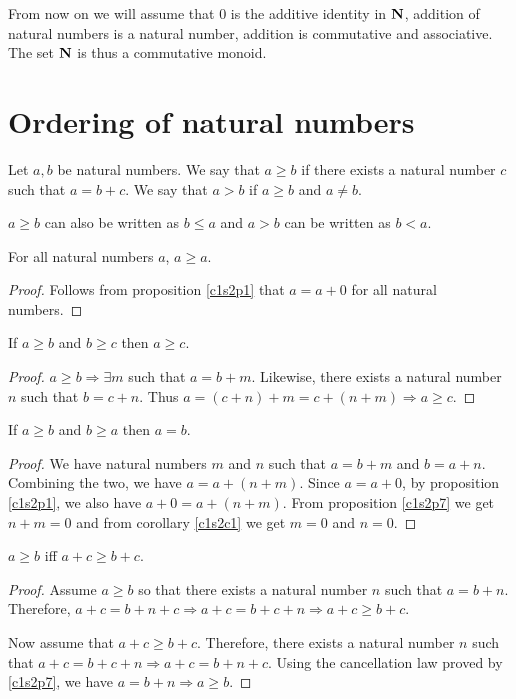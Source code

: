 From now on we will assume that $0$ is the additive identity in $\mathbf{N}$, 
addition of natural numbers is a natural number, addition is commutative 
and associative. The set $\mathbf{N}$ is thus a commutative monoid.

\section{Ordering of natural numbers}\label{c1s3}
\begin{defn}\label{c1s3d1}
Let $a, b$ be natural numbers. We say that $a \ge b$ if there exists a 
natural number $c$ such that $a = b + c$. We say that $a > b$ if $a \ge b$
and $a \ne b$.
\end{defn}

\begin{rem}
$a \ge b$ can also be written as $b \le a$ and $a > b$ can be written as 
$b < a$.
\end{rem}

\begin{lem}\label{c1s3l1}
For all natural numbers $a$, $a \ge a$.
\end{lem}
\begin{proof}
Follows from proposition \ref{c1s2p1} that $a = a + 0$ for all natural
numbers.
\end{proof}

\begin{lem}\label{c1s3l2}
If $a \ge b$ and $b \ge c$ then $a \ge c$.
\end{lem}
\begin{proof}
$a \ge b \Rightarrow \exists m$ such that $a = b + m$. Likewise, there 
exists a natural number $n$ such that $b = c + n$. Thus $a = (c + n) + m
= c + (n + m) \Rightarrow a \ge c$.
\end{proof}

\begin{lem}\label{c1s3l3}
If $a \ge b$ and $b \ge a$ then $a = b$.
\end{lem}
\begin{proof}
We have natural numbers $m$ and $n$ such that $a = b + m$ and $b = a + n$.
Combining the two, we have $a = a + (n + m)$. Since $a = a + 0$, by
proposition \ref{c1s2p1}, we also have $a + 0 = a + (n + m)$. From 
proposition \ref{c1s2p7} we get $n + m = 0$ and from corollary \ref{c1s2c1}
we get $m = 0$ and $n = 0$.
\end{proof}

\begin{lem}\label{c1s3l4}
$a \ge b$ iff $a + c \ge b + c$.
\end{lem}
\begin{proof}
Assume $a \ge b$ so that there exists a natural number $n$ such that $a = 
b + n$. Therefore, $a + c = b + n + c \Rightarrow a + c = b + c + n
\Rightarrow a + c \ge b + c$.

Now assume that $a + c \ge b + c$. Therefore, there exists a natural number
$n$ such that $a + c = b + c + n \Rightarrow a + c = b + n + c$. Using the
cancellation law proved by \ref{c1s2p7}, we have $a = b + n \Rightarrow
a \ge b$.
\end{proof}

